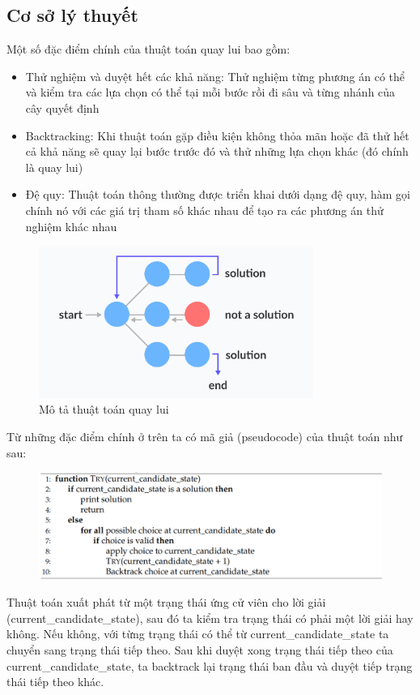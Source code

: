 \documentclass[12pt,a4paper]{article}\author{Nguyễn Nho Dũng}
\begin{document}
\subsection{Cơ sở lý thuyết}
Một số đặc điểm chính của thuật toán quay lui bao gồm:
\begin{itemize}
	\item Thử nghiệm và duyệt hết các khả năng: Thử nghiệm từng phương án có thể và kiểm tra các lựa chọn có thể tại mỗi bước rồi đi sâu và từng nhánh của cây quyết định
	\item Backtracking: Khi thuật toán gặp điều kiện không thỏa mãn hoặc đã thử hết cả khả năng sẽ quay lại bước trước đó và thử những lựa chọn khác (đó chính là quay lui)
	\item Đệ quy: Thuật toán thông thường được triển khai dưới dạng đệ quy, hàm gọi chính nó với các giá trị tham số khác nhau để tạo ra các phương án thử nghiệm khác nhau
\end{itemize}
\begin{figure}[H]
	\centering
	\includegraphics[width=0.8\textwidth]{Anh/mota_back_tracking}
	\caption{Mô tả thuật toán quay lui}
\end{figure}
Từ những đặc điểm chính ở trên ta có mã giả (pseudocode) của thuật toán như sau:
\begin{figure}[H]
	\centering
	\includegraphics[width=\textwidth]{Anh/backtrack_pseudocode}
\end{figure}
Thuật toán xuất phát từ một trạng thái ứng cử viên cho lời giải (current\_candidate\_state), sau đó ta kiểm tra trạng thái có phải một lời giải hay không. Nếu không, với từng trạng thái có thể từ current\_candidate\_state ta chuyển sang trạng thái tiếp theo. Sau khi duyệt xong trạng thái tiếp theo của current\_candidate\_state, ta backtrack lại trạng thái ban đầu và duyệt tiếp trạng thái tiếp theo khác.
\end{document}
